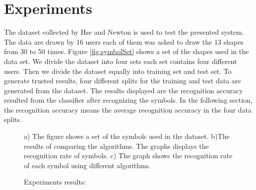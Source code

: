 \documentclass{article}%
\begin{document}
\section{Experiments}
\label{sec:Experiments}
The dataset collected by Hse and Newton is used to test the presented system\cite{HeloiseBeautification}. The data are drawn by 16 users each of them was asked to draw the 13 shapes from 30 to 50 times. Figure \ref{fig:symbolSet} shows a set of the shapes used in the data set. We divide the dataset into four sets each set contains four different users. Then we divide the dataset equally into training set and test set. To generate trusted results, four different splits for the training and test data are generated from the dataset. The results displayed are the recognition accuracy resulted from the classifier after recognizing the symbols. In the following section, the recognition accuracy means the average recognition accuracy in the four data splits. %
\begin{figure*}[]
	\centering
	\begin{minipage}[b]{4cm}
		
		\end{minipage}
		\hfill
	\caption{Experiments results:} a) The figure shows a set of the symbols used in the dataset.   b)The results of comparing the algorithms. The graphs displays the recognition rate of symbols. c) The graph shows the recognition rate of each symbol using different algorithms. 
\end{figure*}
\end{document}
